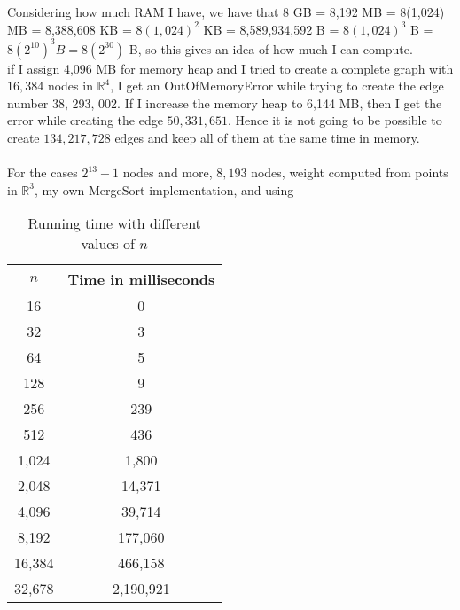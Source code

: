 \documentclass[tikz, 12pt]{scrartcl}
\begin{document}
Considering how much RAM I have, we have that 8 GB = 8,192 MB = 8(1,024) MB = 8,388,608 KB = $8(1,024)^2$ KB = 8,589,934,592 B = $8(1,024)^3$ B = $8 (2^{10})^3 B = 8(2^{30})$ B, so this gives an idea of how much I can compute.
\\
if I assign 4,096 MB for memory heap and I tried to create a complete graph with $16,384$ nodes in $\mathbb{R}^4$, I get an OutOfMemoryError while trying to create the edge number 38, 293, 002. If I increase the memory heap to 6,144 MB, then I get the error while creating the edge $50,331,651$. Hence it is not going to be possible to create $134,217,728$ edges and keep all of them at the same time in memory. \\
\\
For the cases $2^{13} + 1$ nodes and more, 
$8,193$ nodes, weight computed from points in $\mathbb{R}^3$, my own MergeSort implementation,  and using  

\begin{table}
\centering
\caption{Running time with different values of $n$}
\begin{tabular}{|c|c|}
\hline
$n$	&	Time in milliseconds	\\
\hline
16		&              0 \\
32		&	          3\\
64		&		   5\\
128		&              9 \\
256		&		239\\
512		&	      436\\
1,024	&	    1,800\\
2,048	&	  14,371\\
4,096	&	  39,714\\
8,192	&	177,060	\\
16,384	&	466,158\\
32,678	&  2,190,921\\
\hline
\end{tabular}
\end{table}
\end{document}

